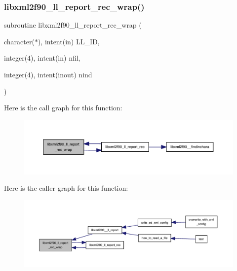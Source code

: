 \subsubsection{\texorpdfstring{libxml2f90\+\_\+ll\+\_\+report\+\_\+rec\+\_\+wrap()}{libxml2f90\_ll\_report\_rec\_wrap()}}
{\footnotesize\ttfamily subroutine libxml2f90\+\_\+ll\+\_\+report\+\_\+rec\+\_\+wrap (\begin{DoxyParamCaption}\item[{character($\ast$), intent(in)}]{L\+L\+\_\+\+ID,  }\item[{integer(4), intent(in)}]{nfil,  }\item[{integer(4), intent(inout)}]{nind }\end{DoxyParamCaption})}

Here is the call graph for this function\+:
\nopagebreak
\begin{figure}[H]
\begin{center}
\leavevmode
\includegraphics[width=350pt]{libxml2f90_8f90__pp_8f90_aab03f23626a21bebdc849515ddbb2a84_cgraph}
\end{center}
\end{figure}
Here is the caller graph for this function\+:
\nopagebreak
\begin{figure}[H]
\begin{center}
\leavevmode
\includegraphics[width=350pt]{libxml2f90_8f90__pp_8f90_aab03f23626a21bebdc849515ddbb2a84_icgraph}
\end{center}
\end{figure}
\mbox{\label{libxml2f90_8f90__pp_8f90_a41bf2706485a325b4b1515c83ac50a67}} 
